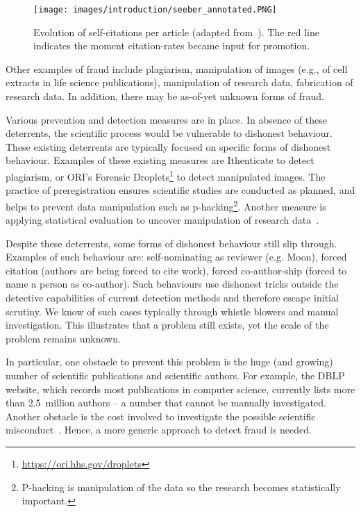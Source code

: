 \documentclass{ou-report}
\begin{document}
\begin{figure}[H]
\centering
\texttt{[image: images/introduction/seeber\_annotated.PNG]}
\caption{Evolution of self-citations per article (adapted from~\cite{SEEBER2019478}).
    The red line indicates the moment citation-rates became input for promotion.}
\label{fig:seeber}
\end{figure}

Other examples of fraud include plagiarism, manipulation  of images
(e.g., of cell extracts in life science publications), manipulation of research
data, fabrication of research data. In addition, there may be as-of-yet unknown
forms of fraud.

Various prevention and detection measures are in place. In absence of these 
deterrents, the scientific process would be vulnerable to dishonest behaviour. 
These existing deterrents are typically focused on specific forms of dishonest 
behaviour. Examples of these existing measures are Ithenticate to detect 
plagiarism, or ORI's Forensic
Droplets\footnote{\url{https://ori.hhs.gov/droplets}} 
to detect manipulated images. The practice of preregistration ensures scientific
studies are conducted as planned, and helps to prevent data manipulation such as
p-hacking\footnote{P-hacking is manipulation of the data so the research becomes
statistically important.}. Another measure is applying statistical evaluation to
uncover manipulation of research data~\cite{HGWA2019}. 

Despite these deterrents, some forms of dishonest behaviour still slip through.
Examples of such behaviour are:
self-nominating as reviewer (e.g. Moon), forced citation (authors are being
forced to cite work), forced co-author-ship (forced to name a person as
co-author).
Such behaviours use dishonest tricks outside the detective capabilities of
current detection methods and therefore escape initial scrutiny. We know of
such cases typically through whistle blowers and manual investigation. 
This illustrates that a problem still exists, yet the scale of the
problem remains unknown.

In particular, one obstacle to prevent this problem is the huge (and growing) 
number of scientific 
publications and scientific authors. For example, the DBLP website, which 
records most publications in computer science, currently lists more than 
2.5~million authors -- a number that cannot be manually investigated. 
Another obstacle is the cost involved to investigate the possible scientific 
misconduct~\cite{MHWT2010}.
Hence, a more generic approach to detect fraud is needed. 
\end{document}
